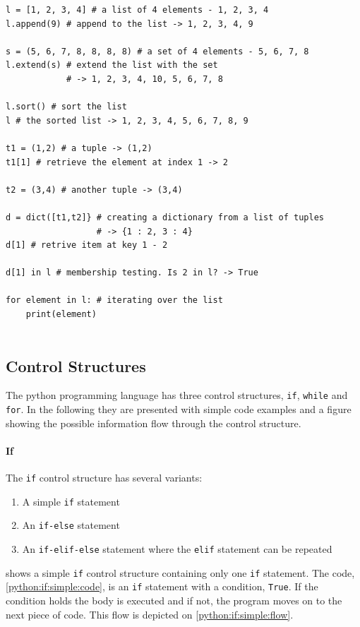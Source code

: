 \begin{lstlisting}[style=python, caption={Usage of Python collections}, label=collections]
l = [1, 2, 3, 4] # a list of 4 elements - 1, 2, 3, 4
l.append(9) # append to the list -> 1, 2, 3, 4, 9

s = (5, 6, 7, 8, 8, 8, 8) # a set of 4 elements - 5, 6, 7, 8
l.extend(s) # extend the list with the set
            # -> 1, 2, 3, 4, 10, 5, 6, 7, 8

l.sort() # sort the list
l # the sorted list -> 1, 2, 3, 4, 5, 6, 7, 8, 9

t1 = (1,2) # a tuple -> (1,2)
t1[1] # retrieve the element at index 1 -> 2

t2 = (3,4) # another tuple -> (3,4)

d = dict([t1,t2]} # creating a dictionary from a list of tuples
                  # -> {1 : 2, 3 : 4}
d[1] # retrive item at key 1 - 2
  
d[1] in l # membership testing. Is 2 in l? -> True
    
for element in l: # iterating over the list
    print(element) 
    
\end{lstlisting}

\subsection{Control Structures}\label{python:control_structures}
The python programming language has three control structures, \texttt{if}, \texttt{while} and \texttt{for}.
In the following they are presented with simple code examples and a figure showing the possible information flow through the control structure.

\paragraph{If}
The \texttt{if} control structure has several variants:
\begin{enumerate}
\item A simple \texttt{if} statement
\item An \texttt{if-else} statement
\item An \texttt{if-elif-else} statement where the \texttt{elif} statement can be repeated
\end{enumerate}

 shows a simple \texttt{if} control structure containing only one \texttt{if} statement.
The code, \cref{python:if:simple:code}, is an \texttt{if} statement with a condition, \texttt{True}.
If the condition holds the body is executed and if not, the program moves on to the next piece of code.
This flow is depicted on \cref{python:if:simple:flow}.

